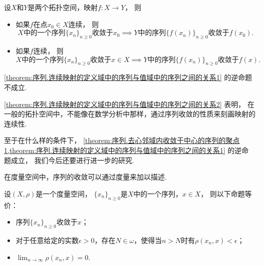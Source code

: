\begin{theorem}\label{theorem:序列.连续映射的定义域中的序列与值域中的序列之间的关系1}
设\(X\)和\(Y\)是两个拓扑空间，映射\(f\colon X \to Y\)，
则\begin{itemize}
	\item 如果\(f\)在点\(x_0 \in X\)连续，
	则\begin{equation*}
		\text{$X$中的一个序列$\{x_n\}_{n\geq0}$收敛于$x_0$}
		\implies
		\text{$Y$中的序列$\{f(x_n)\}_{n\geq0}$收敛于$f(x_0)$}.
	\end{equation*}

	\item 如果\(f\)连续，
	则\begin{equation*}
		\text{$X$中的一个序列$\{x_n\}_{n\geq0}$收敛于$x \in X$}
		\implies
		\text{$Y$中的序列$\{f(x_n)\}_{n\geq0}$收敛于$f(x)$}.
	\end{equation*}
\end{itemize}
\end{theorem}

\begin{proposition}\label{theorem:序列.连续映射的定义域中的序列与值域中的序列之间的关系2}
\cref{theorem:序列.连续映射的定义域中的序列与值域中的序列之间的关系1} 的逆命题不成立.
\end{proposition}

\cref{theorem:序列.连续映射的定义域中的序列与值域中的序列之间的关系2} 表明，
在一般的拓扑空间中，不能像在数学分析中那样，通过序列收敛的性质来刻画映射的连续性.

至于在什么样的条件下，
\cref{theorem:序列.去心邻域内收敛于中心的序列的聚点1,theorem:序列.连续映射的定义域中的序列与值域中的序列之间的关系1} 的逆命题成立，
我们今后还要进行进一步的研究.

在度量空间中，序列的收敛可以通过度量来加以描述.
\begin{theorem}\label{theorem:序列.度量空间中的收敛序列}
设\((X,\rho)\)是一个度量空间，
\(\{x_n\}_{n\geq0}\)是\(X\)中的一个序列，\(x \in X\)，
则以下命题等价：\begin{itemize}
	\item 序列\(\{x_n\}_{n\geq0}\)收敛于\(x\)；
	\item 对于任意给定的实数\(\epsilon>0\)，存在\(N\in\omega\)，使得当\(n>N\)时有\(\rho(x_n,x)<\epsilon\)；
	\item \(\lim_{n\to\infty} \rho(x_n,x) = 0\).
\end{itemize}
\end{theorem}

